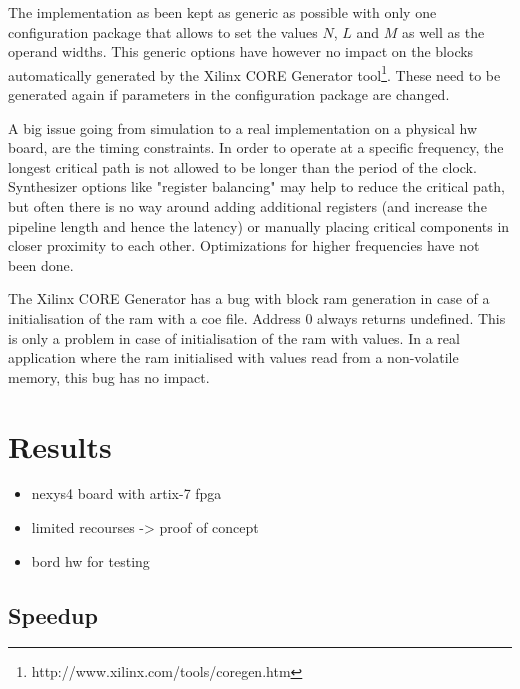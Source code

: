 \documentclass[mscthesis]{usiinfthesis}
\begin{document}
The implementation as been kept as generic as possible with only one
configuration package that allows to set the values $N$, $L$ and $M$ as well as
the operand widths. This generic options have however no impact on the blocks
automatically generated by the Xilinx CORE Generator
tool\footnote{http://www.xilinx.com/tools/coregen.htm}. These need to be
generated again if parameters in the configuration package are changed.

A big issue going from simulation to a real implementation on a physical
\gls{hw} board, are the timing constraints. In order to operate at a specific
frequency, the longest critical path is not allowed to be longer than the
period of the clock. Synthesizer options like "register balancing" may help to
reduce the critical path, but often there is no way around adding additional
registers (and increase the pipeline length and hence the latency) or manually
placing critical components in closer proximity to each other. Optimizations
for higher frequencies have not been done.

The Xilinx CORE Generator has a bug with block \gls{ram} generation in case
of a initialisation of the \gls{ram} with a coe file. Address 0 always returns
undefined. This is only a problem in case of initialisation of the \gls{ram}
with values. In a real application where the \gls{ram} initialised with values
read from a non-volatile memory, this bug has no impact.

\chapter{Results}
\label{ch:results}
\glsresetall %

\begin{itemize}
    \item nexys4 board with artix-7 fpga
    \item limited recourses -> proof of concept
    \item bord \gls{hw} for testing
\end{itemize}

\section{Speedup}
\end{document}
